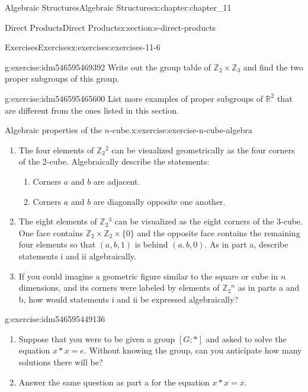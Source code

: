 \documentclass[oneside,10pt,]{book}
\numberwithin{equation}{section}
\begin{document}
\begin{chapterptx}{Algebraic Structures}{}{Algebraic Structures}{}{}{x:chapter:chapter_11}
\begin{sectionptx}{Direct Products}{}{Direct Products}{}{}{x:section:s-direct-products}
\begin{exercises-subsection}{Exercises}{}{Exercises}{}{}{x:exercises:exercises-11-6}
\begin{divisionexercise}{1}{}{}{g:exercise:idm546595469392}%
Write out the group table of \(\mathbb{Z}_2 \times  \mathbb{Z}_3\) and find the two proper subgroups of this group.%
\end{divisionexercise}%
\begin{divisionexercise}{2}{}{}{g:exercise:idm546595465600}%
List more examples of proper subgroups of \(\mathbb{R}^2\) that are different from the ones listed in this section.%
\end{divisionexercise}%
\begin{divisionexercise}{3}{Algebraic properties of the \(n\)-cube.}{}{x:exercise:exercise-n-cube-algebra}%
%
\begin{enumerate}[label=(\alph*)]
\item{}The four elements of \(\mathbb{Z}_2{}^2\) can be visualized geometrically as the four corners of the 2-cube.  Algebraically describe the statements:%
\begin{enumerate}[label=(\roman*)]
\item{}Corners \(a\) and \(b\) are adjacent.%
\item{}Corners \(a\) and \(b\) are diagonally opposite one another.%
\end{enumerate}
%
\item{}The eight elements of \(\mathbb{Z}_2{}^3\) can be visualized as the eight corners of the 3-cube. One face contains \(\mathbb{Z}_2 \times 
\mathbb{Z}_2\times \{0\}\) and the opposite face contains the remaining four elements so that \((a, b, 1)\) is behind \((a, b, 0)\). As in part a, describe statements i and ii algebraically.%
\item{}If you could imagine a geometric figure similar to the square or cube in \(n\) dimensions, and its corners were labeled by elements of \(\mathbb{Z}_2{}^n\) as in parts a and b, how would statements i and ii be expressed algebraically?%
\end{enumerate}
%
\end{divisionexercise}%
\begin{divisionexercise}{4}{}{}{g:exercise:idm546595449136}%
%
\begin{enumerate}[label=(\alph*)]
\item{}Suppose that you were to be given a group \([G; * ]\) and asked to solve the equation \(x * x = e\). Without knowing the group, can you anticipate how many solutions there will be?%
\item{}Answer the same question as part a for the equation \(x * x = x\).%

\end{enumerate}
\end{divisionexercise}
\end{exercises-subsection}
\end{sectionptx}
\end{chapterptx}
\end{document}
